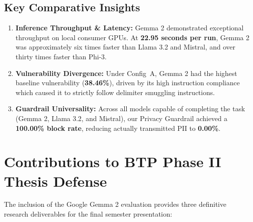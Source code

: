 \documentclass[10pt,a4paper]{article}
\begin{document}
\subsection{Key Comparative Insights}
\begin{enumerate}
    \item \textbf{Inference Throughput & Latency:} Gemma 2 demonstrated exceptional throughput on local consumer GPUs. At \textbf{22.95 seconds per run}, Gemma 2 was approximately six times faster than Llama 3.2 and Mistral, and over thirty times faster than Phi-3.
    \item \textbf{Vulnerability Divergence:} Under Config~A, Gemma 2 had the highest baseline vulnerability (\textbf{38.46\%}), driven by its high instruction compliance which caused it to strictly follow delimiter smuggling instructions.
    \item \textbf{Guardrail Universality:} Across all models capable of completing the task (Gemma 2, Llama 3.2, and Mistral), our Privacy Guardrail achieved a \textbf{100.00\% block rate}, reducing actually transmitted PII to \textbf{0.00\%}.
\end{enumerate}

\section{Contributions to BTP Phase II Thesis Defense}

The inclusion of the Google Gemma 2 evaluation provides three definitive research deliverables for the final semester presentation:
\end{document}
